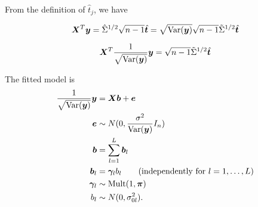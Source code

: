 From the definition of $\hat{t}_{j}$, we have

\begin{equation}
    \bm X^{T}\bm y = \hat{\Sigma}^{1/2} \sqrt{n-1} \hat{\bm{t}} = \sqrt{\text{Var}(\bm y)} \sqrt{n-1} \tilde{\Sigma}^{1/2} \hat{\bm{t}}
\end{equation}

\begin{equation}
    \bm X^{T} \frac{1}{\sqrt{\text{Var}(\bm y)}}\bm y = \sqrt{n-1} \tilde{\Sigma}^{1/2} \hat{\bm{t}}
\end{equation}

The fitted \susie model is
\begin{align}
\frac{1}{\sqrt{\text{Var}(\bm y)}}\bm y &= \bm X\bm b + \bm e \\
\bm e & \sim N(0, \frac{\sigma^2}{\text{Var}(\bm y)}I_n) \\ 
\bm b &= \sum_{l=1}^L \bm b_l\\
\bm b_l & = \bm \gamma_l b_l \qquad (\text{independently for } l=1,\dots,L)\\
\bm \gamma_l & \sim \text{Mult}(1,\bm \pi) \\
b_l & \sim N(0,\sigma^2_{0l}).
\end{align}
